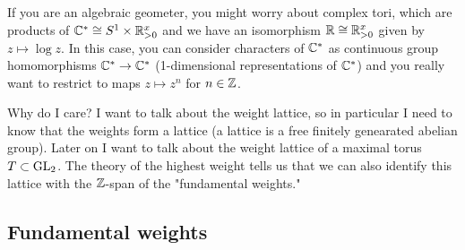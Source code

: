 \documentclass[12pt]{article}
\begin{document}
\hfill

If you are an algebraic geometer, you might worry about complex tori, which are products of $\mathbb{C}^* \cong S^1\times \mathbb{R}^{x}_{>0}$ and
we have an isomorphism $\mathbb{R}\cong \mathbb{R}^x_{>0}$ given by $z\mapsto \log z$. In this case, you can consider
characters of $\mathbb{C}^*$ as continuous group homomorphisms $\mathbb{C}^*\to\mathbb{C}^*$ (1-dimensional representations of $\mathbb{C}^*$) and you really want to restrict to maps $z\mapsto z^n$ for $n\in \mathbb{Z}$. 



Why do I care? I want to talk about the weight lattice, so in particular I need to know that the weights
form a lattice (a lattice is a free finitely genearated abelian group). Later on I want to talk 
about the weight lattice of a maximal torus $ T\subset \operatorname{GL}_2$. The theory of the highest weight tells us
that we can also identify this lattice with the $\mathbb{Z}$-span of the "fundamental weights."

\subsection{Fundamental weights}
\end{document}
